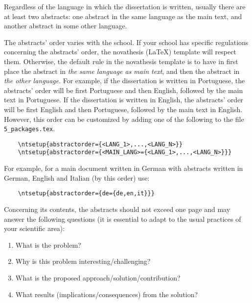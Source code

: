
%

Regardless of the language in which the dissertation is written, usually there are at least two abstracts: one abstract in the same language as the main text, and another abstract in some other language.

The abstracts' order varies with the school.  If your school has specific regulations concerning the abstracts' order, the \gls{novathesis} (\LaTeX) template will respect them.  Otherwise, the default rule in the \gls{novathesis} template is to have in first place the abstract in \emph{the same language as main text}, and then the abstract in \emph{the other language}. For example, if the dissertation is written in Portuguese, the abstracts' order will be first Portuguese and then English, followed by the main text in Portuguese. If the dissertation is written in English, the abstracts' order will be first English and then Portuguese, followed by the main text in English.
%
However, this order can be customized by adding one of the following to the file \verb+5_packages.tex+.

\begin{verbatim}
    \ntsetup{abstractorder={<LANG_1>,...,<LANG_N>}}
    \ntsetup{abstractorder={<MAIN_LANG>={<LANG_1>,...,<LANG_N>}}}
\end{verbatim}

For example, for a main document written in German with abstracts written in German, English and Italian (by this order) use:
\begin{verbatim}
    \ntsetup{abstractorder={de={de,en,it}}}
\end{verbatim}

Concerning its contents, the abstracts should not exceed one page and may answer the following questions (it is essential to adapt to the usual practices of your scientific area):

\begin{enumerate}
  \item What is the problem?
  \item Why is this problem interesting/challenging?
  \item What is the proposed approach/solution/contribution?
  \item What results (implications/consequences) from the solution?
\end{enumerate}

